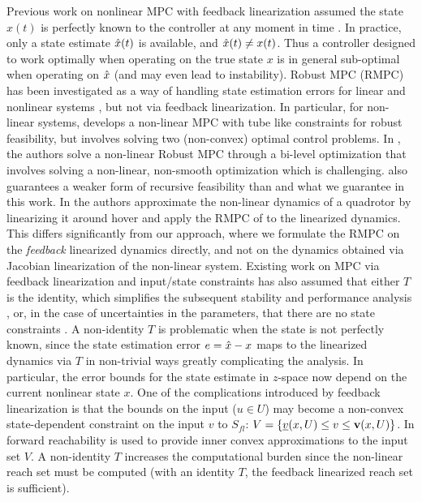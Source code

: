 Previous work on nonlinear MPC with feedback linearization assumed the state $x(t)$ is perfectly known to the controller at any moment in time \cite{SimonLG13_MPC}.
In practice, only a state estimate $\hat{x}(t)$ is available, and $\hat{x}(t) \neq x(t)$.
Thus a controller designed to work optimally when operating on the true state $x$ is in general sub-optimal when operating on $\hat{x}$ (and may even lead to instability).
Robust MPC (RMPC) has been investigated as a way of handling state estimation errors for linear \cite{RichardsH05_RMPC} and nonlinear systems \cite{tube,relaxed}, but not via feedback linearization. 
In particular, for non-linear systems, \cite{tube} develops a non-linear MPC with tube like constraints for robust feasibility, but involves solving two (non-convex) optimal control problems. 
In \cite{relaxed}, the authors solve a non-linear Robust MPC through a bi-level optimization that involves solving a non-linear, non-smooth optimization which is challenging. 
\cite{relaxed} also guarantees a weaker form of recursive feasibility than \cite{RichardsH05_RMPC} and what we guarantee in this work. 
In \cite{Zhao20141335} the authors approximate the non-linear dynamics of a quadrotor by linearizing it around hover and apply the RMPC of \cite{RichardsH05_RMPC} to the linearized dynamics.
This differs significantly from our approach, where we formulate the RMPC on the \emph{feedback} linearized dynamics directly, and not on the dynamics obtained via Jacobian linearization of the non-linear system.
Existing work on MPC via feedback linearization and input/state constraints has also assumed that either $T$ is the identity, which simplifies the subsequent stability and performance analysis \cite{SimonLG13_MPC}, 
or, in the case of uncertainties in the parameters, that there are no state constraints \cite{parameter}.
A non-identity $T$ is problematic when the state is not perfectly known, since the state estimation error $e = \hat{x}-x$ maps to the linearized dynamics via $T$ in non-trivial ways greatly complicating the analysis.
In particular, the error bounds for the state estimate in $z$-space now depend on the current nonlinear state $x$.
One of the complications introduced by feedback linearization is that the bounds on the input ($u \in U$) may become a non-convex state-dependent constraint on the input $v$ to $S_{fl}$: 
$V = \{\underline{v}(x, U) \leq v \leq \mathbf{v}(x,U)\}$.
In \cite{SimonLG13_MPC} forward reachability is used to provide inner convex approximations to the input set $V$.
A non-identity $T$ increases the computational burden since the non-linear reach set must be computed (with an identity $T$, the feedback linearized reach set is sufficient).

